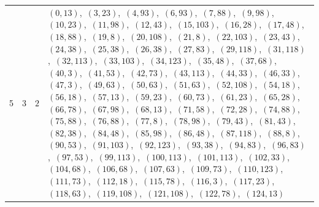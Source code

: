 \documentclass[11pt]{article}
\begin{document}
\begin{longtable}{@{}rrl>{\raggedright\arraybackslash}p{}@{}}
5 & 3 & $2$ & $(0,13)$,\allowbreak\ $(3,23)$,\allowbreak\ $(4,93)$,\allowbreak\ $(6,93)$,\allowbreak\ $(7,88)$,\allowbreak\ $(9,98)$,\allowbreak\ $(10,23)$,\allowbreak\ $(11,98)$,\allowbreak\ $(12,43)$,\allowbreak\ $(15,103)$,\allowbreak\ $(16,28)$,\allowbreak\ $(17,48)$,\allowbreak\ $(18,88)$,\allowbreak\ $(19,8)$,\allowbreak\ $(20,108)$,\allowbreak\ $(21,8)$,\allowbreak\ $(22,103)$,\allowbreak\ $(23,43)$,\allowbreak\ $(24,38)$,\allowbreak\ $(25,38)$,\allowbreak\ $(26,38)$,\allowbreak\ $(27,83)$,\allowbreak\ $(29,118)$,\allowbreak\ $(31,118)$,\allowbreak\ $(32,113)$,\allowbreak\ $(33,103)$,\allowbreak\ $(34,123)$,\allowbreak\ $(35,48)$,\allowbreak\ $(37,68)$,\allowbreak\ $(40,3)$,\allowbreak\ $(41,53)$,\allowbreak\ $(42,73)$,\allowbreak\ $(43,113)$,\allowbreak\ $(44,33)$,\allowbreak\ $(46,33)$,\allowbreak\ $(47,3)$,\allowbreak\ $(49,63)$,\allowbreak\ $(50,63)$,\allowbreak\ $(51,63)$,\allowbreak\ $(52,108)$,\allowbreak\ $(54,18)$,\allowbreak\ $(56,18)$,\allowbreak\ $(57,13)$,\allowbreak\ $(59,23)$,\allowbreak\ $(60,73)$,\allowbreak\ $(61,23)$,\allowbreak\ $(65,28)$,\allowbreak\ $(66,78)$,\allowbreak\ $(67,98)$,\allowbreak\ $(68,13)$,\allowbreak\ $(71,58)$,\allowbreak\ $(72,28)$,\allowbreak\ $(74,88)$,\allowbreak\ $(75,88)$,\allowbreak\ $(76,88)$,\allowbreak\ $(77,8)$,\allowbreak\ $(78,98)$,\allowbreak\ $(79,43)$,\allowbreak\ $(81,43)$,\allowbreak\ $(82,38)$,\allowbreak\ $(84,48)$,\allowbreak\ $(85,98)$,\allowbreak\ $(86,48)$,\allowbreak\ $(87,118)$,\allowbreak\ $(88,8)$,\allowbreak\ $(90,53)$,\allowbreak\ $(91,103)$,\allowbreak\ $(92,123)$,\allowbreak\ $(93,38)$,\allowbreak\ $(94,83)$,\allowbreak\ $(96,83)$,\allowbreak\ $(97,53)$,\allowbreak\ $(99,113)$,\allowbreak\ $(100,113)$,\allowbreak\ $(101,113)$,\allowbreak\ $(102,33)$,\allowbreak\ $(104,68)$,\allowbreak\ $(106,68)$,\allowbreak\ $(107,63)$,\allowbreak\ $(109,73)$,\allowbreak\ $(110,123)$,\allowbreak\ $(111,73)$,\allowbreak\ $(112,18)$,\allowbreak\ $(115,78)$,\allowbreak\ $(116,3)$,\allowbreak\ $(117,23)$,\allowbreak\ $(118,63)$,\allowbreak\ $(119,108)$,\allowbreak\ $(121,108)$,\allowbreak\ $(122,78)$,\allowbreak\ $(124,13)$\\

\end{longtable}
\end{document}
